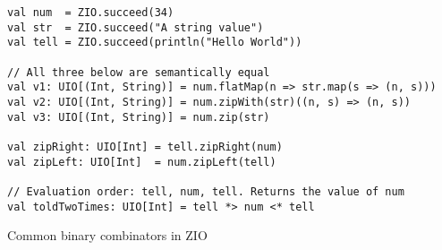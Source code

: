 \begin{algorithm}

\begin{verbatim}
val num  = ZIO.succeed(34)
val str  = ZIO.succeed("A string value")
val tell = ZIO.succeed(println("Hello World"))

// All three below are semantically equal
val v1: UIO[(Int, String)] = num.flatMap(n => str.map(s => (n, s)))
val v2: UIO[(Int, String)] = num.zipWith(str)((n, s) => (n, s))
val v3: UIO[(Int, String)] = num.zip(str)

val zipRight: UIO[Int] = tell.zipRight(num)
val zipLeft: UIO[Int]  = num.zipLeft(tell)

// Evaluation order: tell, num, tell. Returns the value of num
val toldTwoTimes: UIO[Int] = tell *> num <* tell
\end{verbatim}

\caption{Common binary combinators in ZIO \label{zio:binary-combinators}}
\end{algorithm}